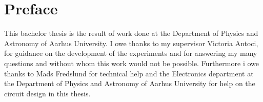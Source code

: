 \chapter*{Preface}
This bachelor thesis is the result of work done at the Department of Physics and Astronomy of Aarhus University. I owe thanks to my supervisor Victoria Antoci, for guidance on the development of the experiments and for answering my many questions and without whom this work would not be possible. Furthermore i owe thanks to Mads Fredslund for technical help and the Electronics department at the Department of Physics and Astronomy of Aarhus University for help on the circuit design in this thesis.